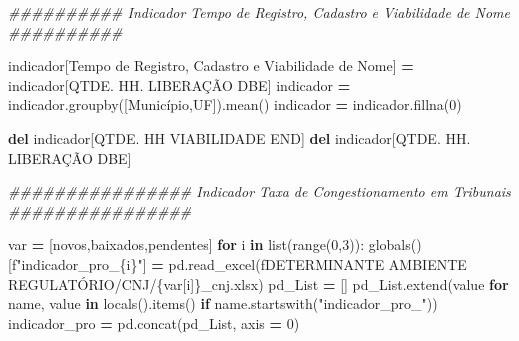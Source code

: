 \documentclass[
  12,
  dvipsnames]{article}
\newenvironment{Shaded}{\begin{snugshade}}{\end{snugshade}}
\newcommand{\BuiltInTok}[1]{#1}
\newcommand{\CommentTok}[1]{\textcolor[rgb]{0.56,0.35,0.01}{\textit{#1}}}
\newcommand{\ControlFlowTok}[1]{\textcolor[rgb]{0.13,0.29,0.53}{\textbf{#1}}}
\newcommand{\DecValTok}[1]{\textcolor[rgb]{0.00,0.00,0.81}{#1}}
\newcommand{\KeywordTok}[1]{\textcolor[rgb]{0.13,0.29,0.53}{\textbf{#1}}}
\newcommand{\NormalTok}[1]{#1}
\newcommand{\OperatorTok}[1]{\textcolor[rgb]{0.81,0.36,0.00}{\textbf{#1}}}
\newcommand{\SpecialCharTok}[1]{\textcolor[rgb]{0.00,0.00,0.00}{#1}}
\newcommand{\SpecialStringTok}[1]{\textcolor[rgb]{0.31,0.60,0.02}{#1}}
\newcommand{\StringTok}[1]{\textcolor[rgb]{0.31,0.60,0.02}{#1}}
\begin{document}
\begin{Shaded}
\begin{Highlighting}[]
\CommentTok{\#\#\#\#\#\#\#\#\#\# Indicador Tempo de Registro, Cadastro e Viabilidade de Nome \#\#\#\#\#\#\#\#\#\#}

\NormalTok{indicador[}\StringTok{\textquotesingle{}Tempo de Registro, Cadastro e Viabilidade de Nome\textquotesingle{}}\NormalTok{] }\OperatorTok{=}\NormalTok{ indicador[}\StringTok{\textquotesingle{}QTDE. HH. LIBERAÇÃO DBE\textquotesingle{}}\NormalTok{]}
\NormalTok{indicador }\OperatorTok{=}\NormalTok{ indicador.groupby([}\StringTok{\textquotesingle{}Município\textquotesingle{}}\NormalTok{,}\StringTok{\textquotesingle{}UF\textquotesingle{}}\NormalTok{]).mean()}
\NormalTok{indicador }\OperatorTok{=}\NormalTok{ indicador.fillna(}\DecValTok{0}\NormalTok{)}

\KeywordTok{del}\NormalTok{ indicador[}\StringTok{\textquotesingle{}QTDE.  HH VIABILIDADE END\textquotesingle{}}\NormalTok{]}
\KeywordTok{del}\NormalTok{ indicador[}\StringTok{\textquotesingle{}QTDE. HH. LIBERAÇÃO DBE\textquotesingle{}}\NormalTok{]}

\CommentTok{\#\#\#\#\#\#\#\#\#\#\#\#\#\#\#\# Indicador Taxa de Congestionamento em Tribunais \#\#\#\#\#\#\#\#\#\#\#\#\#\#\#\#}

\NormalTok{var }\OperatorTok{=}\NormalTok{ [}\StringTok{\textquotesingle{}novos\textquotesingle{}}\NormalTok{,}\StringTok{\textquotesingle{}baixados\textquotesingle{}}\NormalTok{,}\StringTok{\textquotesingle{}pendentes\textquotesingle{}}\NormalTok{]}
\ControlFlowTok{for}\NormalTok{ i }\KeywordTok{in} \BuiltInTok{list}\NormalTok{(}\BuiltInTok{range}\NormalTok{(}\DecValTok{0}\NormalTok{,}\DecValTok{3}\NormalTok{)):}
    \BuiltInTok{globals}\NormalTok{()[}\SpecialStringTok{f"indicador\_pro\_}\SpecialCharTok{\{}\NormalTok{i}\SpecialCharTok{\}}\SpecialStringTok{"}\NormalTok{] }\OperatorTok{=}\NormalTok{ pd.read\_excel(}\SpecialStringTok{f\textquotesingle{}DETERMINANTE AMBIENTE REGULATÓRIO/CNJ/}\SpecialCharTok{\{}\NormalTok{var[i]}\SpecialCharTok{\}}\SpecialStringTok{\_cnj.xlsx\textquotesingle{}}\NormalTok{)}
\NormalTok{    pd\_List }\OperatorTok{=}\NormalTok{ []}
\NormalTok{    pd\_List.extend(value }\ControlFlowTok{for}\NormalTok{ name, value }\KeywordTok{in} \BuiltInTok{locals}\NormalTok{().items() }\ControlFlowTok{if}\NormalTok{ name.startswith(}\StringTok{"indicador\_pro\_"}\NormalTok{))}
\NormalTok{    indicador\_pro }\OperatorTok{=}\NormalTok{ pd.concat(pd\_List, axis }\OperatorTok{=} \DecValTok{0}\NormalTok{)}


\end{Highlighting}
\end{Shaded}
\end{document}
